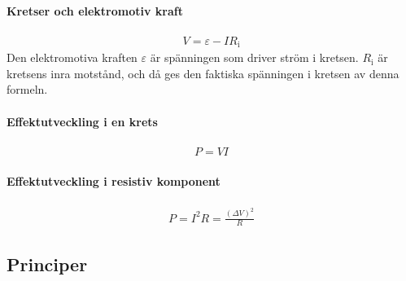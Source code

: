 \paragraph{Kretser och elektromotiv kraft}
\begin{align*}
	V = \varepsilon - IR_\text{i}
\end{align*}
Den elektromotiva kraften $\varepsilon$ är spänningen som driver ström i kretsen. $R_\text{i}$ är kretsens inra motstånd, och då ges den faktiska spänningen i kretsen av denna formeln.

\deriv

\paragraph{Effektutveckling i en krets}
\begin{align*}
	P = VI
\end{align*}

\paragraph{Effektutveckling i resistiv komponent}
\begin{align*}
	P = I^2R = \frac{(\Delta V)^2}{R}
\end{align*}

\subsection{Principer}